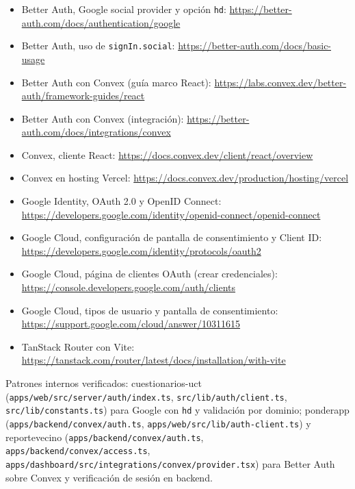 \documentclass[11pt,a4paper]{article}
\begin{document}
\begin{itemize}
  \item Better Auth, Google social provider y opción \texttt{hd}:
    \url{https://better-auth.com/docs/authentication/google}
  \item Better Auth, uso de \texttt{signIn.social}:
    \url{https://better-auth.com/docs/basic-usage}
  \item Better Auth con Convex (guía marco React):
    \url{https://labs.convex.dev/better-auth/framework-guides/react}
  \item Better Auth con Convex (integración):
    \url{https://better-auth.com/docs/integrations/convex}
  \item Convex, cliente React:
    \url{https://docs.convex.dev/client/react/overview}
  \item Convex en hosting Vercel:
    \url{https://docs.convex.dev/production/hosting/vercel}
  \item Google Identity, OAuth 2.0 y OpenID Connect:
    \url{https://developers.google.com/identity/openid-connect/openid-connect}
  \item Google Cloud, configuración de pantalla de consentimiento y Client ID:
    \url{https://developers.google.com/identity/protocols/oauth2}
  \item Google Cloud, página de clientes OAuth (crear credenciales):
    \url{https://console.developers.google.com/auth/clients}
  \item Google Cloud, tipos de usuario y pantalla de consentimiento:
    \url{https://support.google.com/cloud/answer/10311615}
  \item TanStack Router con Vite:
    \url{https://tanstack.com/router/latest/docs/installation/with-vite}
\end{itemize}

Patrones internos verificados: cuestionarios-uct
(\texttt{apps/web/src/server/auth/index.ts},
  \texttt{src/lib/auth/client.ts},
\texttt{src/lib/constants.ts}) para Google con \texttt{hd} y validación por
dominio; ponderapp (\texttt{apps/backend/convex/auth.ts},
\texttt{apps/web/src/lib/auth-client.ts}) y reportevecino
(\texttt{apps/backend/convex/auth.ts},
  \texttt{apps/backend/convex/access.ts},
\texttt{apps/dashboard/src/integrations/convex/provider.tsx}) para Better Auth
sobre Convex y verificación de sesión en backend.
\end{document}
